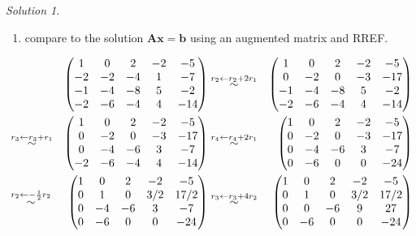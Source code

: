 \documentclass[
]{book}
\providecommand{\tightlist}{%
  \setlength{\itemsep}{0pt}\setlength{\parskip}{0pt}}
\theoremstyle{definition}
\theoremstyle{definition}
\theoremstyle{definition}
\theoremstyle{remark}
\newtheorem*{solution}{Solution}
\begin{document}
\begin{solution}
\begin{enumerate}
\def\labelenumi{\arabic{enumi})}
\setcounter{enumi}{2}
\tightlist
\item
  compare to the solution \(\mathbf{A}\mathbf{x} = \mathbf{b}\) using an augmented matrix and RREF.
\end{enumerate}

\[
\begin{aligned}
& & \begin{pmatrix} 1 & 0 & 2 & -2 & -5 \\ -2 & -2 & -4 & 1 & -7 \\ -1 & -4 & -8 & 5 & -2 \\ -2 & -6 & -4 & 4 & -14 \end{pmatrix} & \stackrel{r_2 \leftarrow r_2 + 2 r_1}{\huge \sim} & \begin{pmatrix} 1 & 0 & 2 & -2 & -5 \\ 0 & -2 & 0 & -3 & -17 \\ -1 & -4 & -8 & 5 & -2 \\ -2 & -6 & -4 & 4 & -14 \end{pmatrix} \\
& \stackrel{r_3 \leftarrow r_3 + r_1}{\huge \sim} & \begin{pmatrix} 1 & 0 & 2 & -2 & -5 \\ 0 & -2 & 0 & -3 & -17 \\ 0 & -4 & -6 & 3 & -7 \\ -2 & -6 & -4 & 4 & -14 \end{pmatrix} & \stackrel{r_4 \leftarrow r_4 + 2 r_1}{\huge \sim} & \begin{pmatrix} 1 & 0 & 2 & -2 & -5 \\ 0 & -2 & 0 & -3 & -17 \\ 0 & -4 & -6 & 3 & -7 \\ 0 & -6 & 0 & 0 & -24 \end{pmatrix} \\
& \stackrel{r_2 \leftarrow - \frac{1}{2} r_2}{\huge \sim} & \begin{pmatrix} 1 & 0 & 2 & -2 & -5 \\ 0 & 1 & 0 & 3/2 & 17/2 \\ 0 & -4 & -6 & 3 & -7 \\ 0 & -6 & 0 & 0 & -24 \end{pmatrix} & \stackrel{r_3 \leftarrow r_3 + 4 r_2}{\huge \sim} & \begin{pmatrix} 1 & 0 & 2 & -2 & -5 \\ 0 & 1 & 0 & 3/2 & 17/2 \\ 0 & 0 & -6 & 9 & 27 \\ 0 & -6 & 0 & 0 & -24 \end{pmatrix} \\

\end{aligned}\]
\end{solution}
\end{document}
